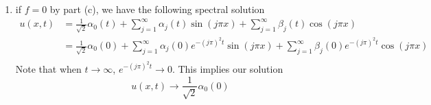 {\begin{solution}
\begin{enumerate}
\begin{align*}
\alpha'_0(t) &= 0,  \qquad \alpha_0(0) = \frac{1}{\sqrt{2}} \int_{-1}^1\psi(x) dx\\
\alpha'_j(t) + (j\pi)^2  \alpha_j(t) &= 0 \qquad \alpha_j(0) = \int_{-1}^1\psi(x) \sin(j\pi x) dx \\
\beta'_j(t) + (j\pi)^2  \beta_j(t) &= 0 \qquad  \beta_j(0) = \int_{-1}^1\psi(x)\cos(j\pi x) dx.
\end{align*}

Solutions of the above system are given respectively

\begin{align*}
\alpha_0(t) &= \alpha_0(0), \\
\alpha_j(t) &=  \alpha_j(0) e^{-(j\pi)^2 t}  \\
\beta_j(t) &= \beta_j(0) e^{-(j\pi)^2 t}
\end{align*}

\item if $f = 0$ by part (c), we have the following spectral solution 
\begin{align*}
u(x,t) &= \frac{1}{\sqrt{2}}\alpha_0(t) + \sum_{j=1}^\infty \alpha_j(t)\sin(j\pi x) + \sum_{j=1}^\infty \beta_j(t)\cos(j\pi x)\\
&=\frac{1}{\sqrt{2}}\alpha_0(0) + \sum_{j=1}^\infty  \alpha_j(0) e^{-(j\pi)^2 t} \sin(j\pi x) + \sum_{j=1}^\infty \beta_j(0) e^{-(j\pi)^2 t}\cos(j\pi x)\\
\end{align*}
Note that when $t\rightarrow \infty$, $e^{-(j\pi)^2 t} \rightarrow 0$. This implies our solution 
\[
u(x,t)\rightarrow \frac{1}{\sqrt{2}}\alpha_0(0)
\]

 
\end{enumerate}
 \end{solution}
}{}
